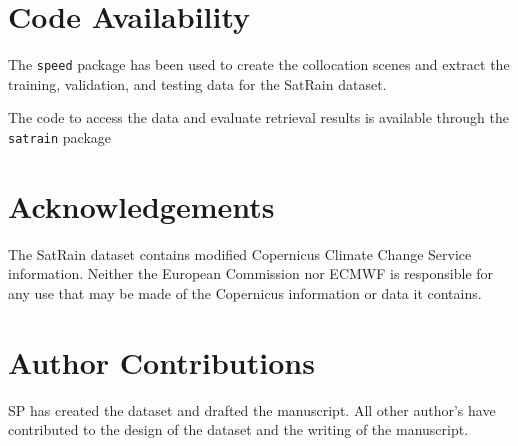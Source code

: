 \documentclass[11pt]{article}
\begin{document}
\section{Code Availability}

The \texttt{speed} package \citep{Speed2025} has been used to create the
collocation scenes and extract the training, validation, and testing data for
the SatRain dataset.

The code to access the data and evaluate retrieval results is available through
the \texttt{satrain} package \citep{SatRain2025}

\section{Acknowledgements}


The SatRain dataset contains modified Copernicus Climate Change Service
information. Neither the European Commission nor ECMWF is responsible for any
use that may be made of the Copernicus information or data it contains.

\section{Author Contributions}

SP has created the dataset and drafted the manuscript. All other author's have
contributed to the design of the dataset and the writing of the manuscript.






\end{document}
